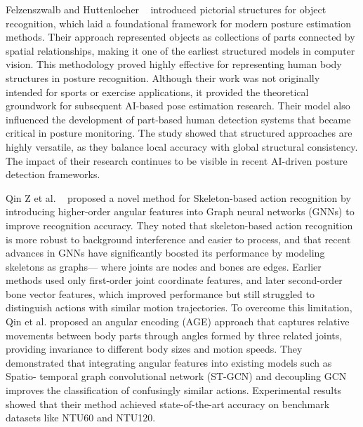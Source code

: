 Felzenszwalb and Huttenlocher ~\cite{felzenszwalb2005pictorial} introduced pictorial structures for object recognition, which laid a foundational framework for modern posture estimation methods. Their approach  
represented objects as collections of parts connected by spatial relationships, making it one of 
the earliest structured models in computer vision. This methodology proved highly effective 
for representing human body structures in posture recognition. Although their work was not 
originally intended for sports or exercise applications, it provided the theoretical groundwork 
for subsequent AI-based pose estimation research. Their model also influenced the 
development of part-based human detection systems that became critical in posture monitoring. 
The study showed that structured approaches are highly versatile, as they balance local 
accuracy with global structural consistency. The impact of their research continues to be visible 
in recent AI-driven posture detection frameworks.

Qin Z et al. ~\cite{qin2022gnn} proposed a novel method for Skeleton-based action recognition by 
introducing higher-order angular features into Graph neural networks (GNNs) to improve 
recognition accuracy. They noted that skeleton-based action recognition is more robust to 
background interference and easier to process, and that recent advances in GNNs have 
significantly boosted its performance by modeling skeletons as graphs— where joints are nodes 
and bones are edges. Earlier methods used only first-order joint coordinate features, and later 
second-order bone vector features, which improved performance but still struggled to 
distinguish actions with similar motion trajectories. To overcome this limitation, Qin et al. 
proposed an angular encoding (AGE) approach that captures relative movements between body 
parts through angles formed by three related joints, providing invariance to different body sizes 
and motion speeds. They demonstrated that integrating angular features into existing models 
such as Spatio- temporal graph convolutional network (ST-GCN) and decoupling GCN 
improves the classification of confusingly similar actions. Experimental results showed that 
their method achieved state-of-the-art accuracy on benchmark datasets like NTU60 and 
NTU120.

